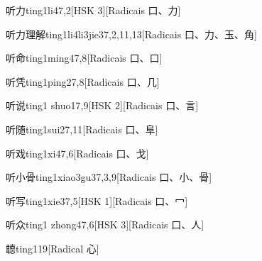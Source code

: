\begin{entry}{听力}{ting1li4}{7,2}[HSK 3][Radicais ⼝、⼒]
\end{entry}

\begin{entry}{听力理解}{ting1li4li3jie3}{7,2,11,13}[Radicais ⼝、⼒、⽟、⾓]
\end{entry}

\begin{entry}{听命}{ting1ming4}{7,8}[Radicais ⼝、⼝]
\end{entry}

\begin{entry}{听凭}{ting1ping2}{7,8}[Radicais ⼝、⼏]
\end{entry}

\begin{entry}{听说}{ting1 shuo1}{7,9}[HSK 2][Radicais ⼝、⾔]
\end{entry}

\begin{entry}{听随}{ting1sui2}{7,11}[Radicais ⼝、⾩]
\end{entry}

\begin{entry}{听戏}{ting1xi4}{7,6}[Radicais ⼝、⼽]
\end{entry}

\begin{entry}{听小骨}{ting1xiao3gu3}{7,3,9}[Radicais ⼝、⼩、⾻]
\end{entry}

\begin{entry}{听写}{ting1xie3}{7,5}[HSK 1][Radicais ⼝、⼍]
\end{entry}

\begin{entry}{听众}{ting1 zhong4}{7,6}[HSK 3][Radicais ⼝、⼈]
\end{entry}

\begin{entry}{聼}{ting1}{19}[Radical ⼼]
\end{entry}

